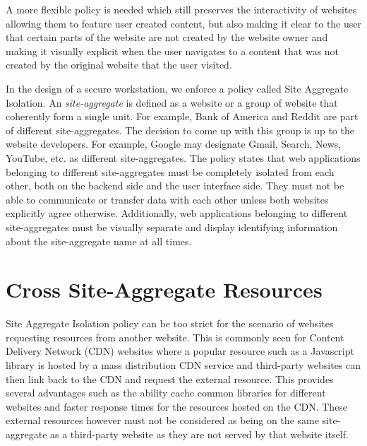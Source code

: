 A more flexible policy is needed which still preserves the interactivity of websites allowing them to feature user created content, but also making it clear to the user that certain parts of the website are not created by the website owner and making it visually explicit when the user navigates to a content that was not created by the original website that the user visited.

In the design of a secure workstation, we enforce a policy called Site Aggregate Isolation. An \textit{site-aggregate} is defined as a website or a group of website that coherently form a single unit. For example, Bank of America and Reddit are part of different site-aggregates. The decision to come up with this group is up to the website developers. For example, Google may designate Gmail, Search, News, YouTube, etc. as different site-aggregates. The policy states that web applications belonging to different site-aggregates must be completely isolated from each other, both on the backend side and the user interface side. They must not be able to communicate or transfer data with each other unless both websites explicitly agree otherwise. Additionally, web applications belonging to different site-aggregates must be visually separate and display identifying information about the site-aggregate name at all times.

\section{Cross Site-Aggregate Resources}

Site Aggregate Isolation policy can be too strict for the scenario of websites requesting resources from another website. This is commonly seen for Content Delivery Network (CDN) websites where a popular resource such as a Javascript library is hosted by a mass distribution CDN service and third-party websites can then link back to the CDN and request the external resource. This provides several advantages such as the ability cache common libraries for different websites and faster response times for the resources hosted on the CDN. These external resources however must not be considered as being on the same site-aggregate as a third-party website as they are not served by that website itself.

